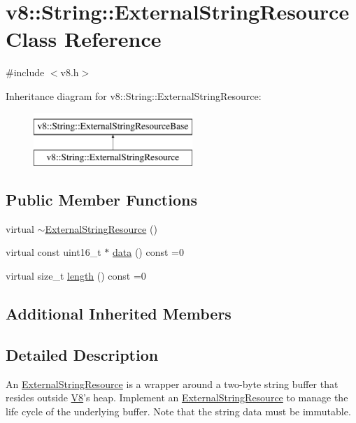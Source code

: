 \hypertarget{classv8_1_1String_1_1ExternalStringResource}{\section{v8\-:\-:String\-:\-:External\-String\-Resource Class Reference}
\label{classv8_1_1String_1_1ExternalStringResource}
}


{\ttfamily \#include $<$v8.\-h$>$}

Inheritance diagram for v8\-:\-:String\-:\-:External\-String\-Resource\-:\begin{figure}[H]
\begin{center}
\leavevmode
\includegraphics[height=2.000000cm]{classv8_1_1String_1_1ExternalStringResource}
\end{center}
\end{figure}
\subsection*{Public Member Functions}
\begin{DoxyCompactItemize}
\item 
virtual \hyperlink{classv8_1_1String_1_1ExternalStringResource_a6b7ef9e33a47059092e1447b10c35416}{$\sim$\-External\-String\-Resource} ()
\item 
virtual const uint16\-\_\-t $\ast$ \hyperlink{classv8_1_1String_1_1ExternalStringResource_a987309199b848511adb708e221e0fb0a}{data} () const =0
\item 
virtual size\-\_\-t \hyperlink{classv8_1_1String_1_1ExternalStringResource_ab5ca300fea077d7c7774ec49d32e4da1}{length} () const =0
\end{DoxyCompactItemize}
\subsection*{Additional Inherited Members}


\subsection{Detailed Description}
An \hyperlink{classv8_1_1String_1_1ExternalStringResource}{External\-String\-Resource} is a wrapper around a two-\/byte string buffer that resides outside \hyperlink{classv8_1_1V8}{V8}'s heap. Implement an \hyperlink{classv8_1_1String_1_1ExternalStringResource}{External\-String\-Resource} to manage the life cycle of the underlying buffer. Note that the string data must be immutable. 


